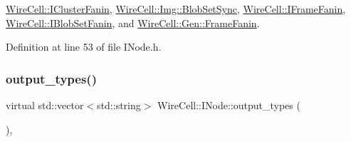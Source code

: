 \hyperlink{class_wire_cell_1_1_i_cluster_fanin_a4021793d08233b3cb10f788d20d313c2}{Wire\+Cell\+::\+I\+Cluster\+Fanin}, \hyperlink{class_wire_cell_1_1_img_1_1_blob_set_sync_aa32d9014596aec6bcbdcd8ed027a95ad}{Wire\+Cell\+::\+Img\+::\+Blob\+Set\+Sync}, \hyperlink{class_wire_cell_1_1_i_frame_fanin_a7c19800cac1dc1bf67199b067811f500}{Wire\+Cell\+::\+I\+Frame\+Fanin}, \hyperlink{class_wire_cell_1_1_i_blob_set_fanin_a1783b57125c4b9df55a828ec832dbb72}{Wire\+Cell\+::\+I\+Blob\+Set\+Fanin}, and \hyperlink{class_wire_cell_1_1_gen_1_1_frame_fanin_aeba173a6fd84de2b655fe56fd41d8c05}{Wire\+Cell\+::\+Gen\+::\+Frame\+Fanin}.



Definition at line 53 of file I\+Node.\+h.

\mbox{\label{class_wire_cell_1_1_i_node_aba7e537684cb4f2453796ff73da2d602}} 
\subsubsection{\texorpdfstring{output\+\_\+types()}{output\_types()}}
{\footnotesize\ttfamily virtual std\+::vector$<$std\+::string$>$ Wire\+Cell\+::\+I\+Node\+::output\+\_\+types (\begin{DoxyParamCaption}{ }\end{DoxyParamCaption})\hspace{0.3cm}{\ttfamily [inline]}, {\ttfamily [virtual]}}



